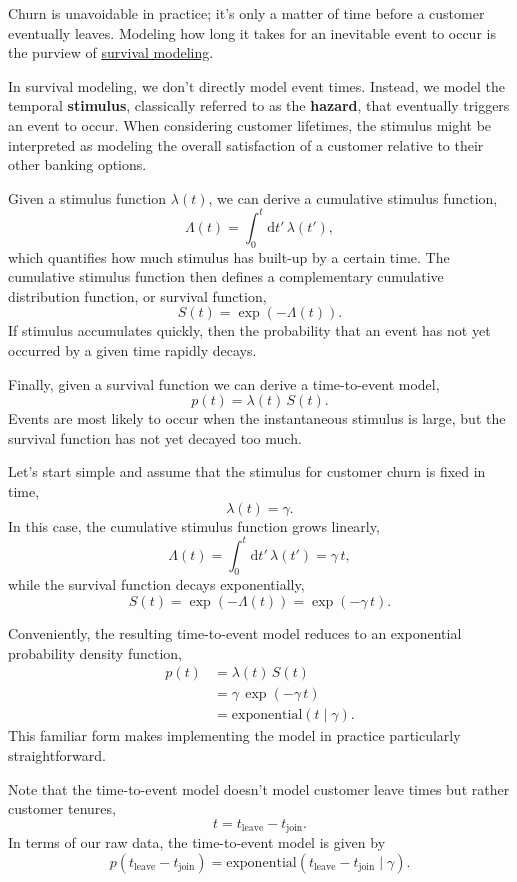 \documentclass[
  letterpaper,
  DIV=11,
  numbers=noendperiod]{scrartcl}
\begin{document}
Churn is unavoidable in practice; it's only a matter of time before a
customer eventually leaves. Modeling how long it takes for an inevitable
event to occur is the purview of
\href{http://www.symplectomorphic.com/assets/case_studies/survival_modeling.html}{survival
modeling}.

In survival modeling, we don't directly model event times. Instead, we
model the temporal \textbf{stimulus}, classically referred to as the
\textbf{hazard}, that eventually triggers an event to occur. When
considering customer lifetimes, the stimulus might be interpreted as
modeling the overall satisfaction of a customer relative to their other
banking options.

Given a stimulus function \(\lambda(t)\), we can derive a cumulative
stimulus function, \[
\Lambda(t) = \int_{0}^{t} \mathrm{d} t' \, \lambda(t'),
\] which quantifies how much stimulus has built-up by a certain time.
The cumulative stimulus function then defines a complementary cumulative
distribution function, or survival function, \[
S(t)
=
\exp \left( - \Lambda(t) \right).
\] If stimulus accumulates quickly, then the probability that an event
has not yet occurred by a given time rapidly decays.

Finally, given a survival function we can derive a time-to-event model,
\[
p(t) = \lambda(t) \, S(t).
\] Events are most likely to occur when the instantaneous stimulus is
large, but the survival function has not yet decayed too much.

Let's start simple and assume that the stimulus for customer churn is
fixed in time, \[
\lambda(t) = \gamma.
\] In this case, the cumulative stimulus function grows linearly, \[
\Lambda(t)
=
\int_{0}^{t} \mathrm{d} t' \, \lambda(t')
=
\gamma \, t,
\] while the survival function decays exponentially, \[
S(t)
=
\exp \left( - \Lambda(t) \right)
=
\exp(-\gamma \, t).
\]

Conveniently, the resulting time-to-event model reduces to an
exponential probability density function, \begin{align*}
p(t)
&=
\lambda(t) \, S(t)
\\
&=
\gamma \, \exp(-\gamma \, t)
\\
&= \mathrm{exponential}(t \mid \gamma).
\end{align*} This familiar form makes implementing the model in practice
particularly straightforward.

Note that the time-to-event model doesn't model customer leave times but
rather customer tenures, \[
t = t_{\text{leave}} - t_{\text{join}}.
\] In terms of our raw data, the time-to-event model is given by \[
p( t_{\text{leave}} - t_{\text{join}} )
=
\mathrm{exponential}(
  t_{\text{leave}} - t_{\text{join}} \mid \gamma
).
\]
\end{document}
